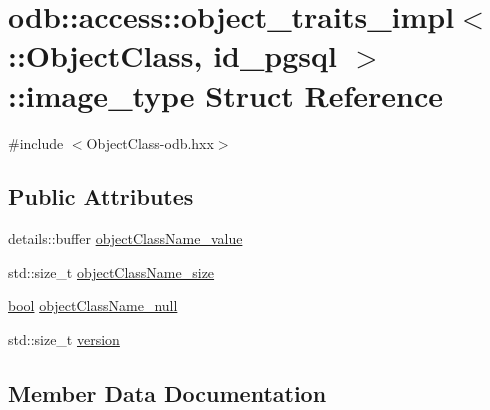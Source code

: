 \hypertarget{structodb_1_1access_1_1object__traits__impl_3_01_1_1_object_class_00_01id__pgsql_01_4_1_1image__type}{}\section{odb\+:\+:access\+:\+:object\+\_\+traits\+\_\+impl$<$ \+:\+:Object\+Class, id\+\_\+pgsql $>$\+:\+:image\+\_\+type Struct Reference}
\label{structodb_1_1access_1_1object__traits__impl_3_01_1_1_object_class_00_01id__pgsql_01_4_1_1image__type}


{\ttfamily \#include $<$Object\+Class-\/odb.\+hxx$>$}

\subsection*{Public Attributes}
\begin{DoxyCompactItemize}
\item 
details\+::buffer \hyperlink{structodb_1_1access_1_1object__traits__impl_3_01_1_1_object_class_00_01id__pgsql_01_4_1_1image__type_a1c1f1c19eaa6bdc564aa4c30da26626b}{object\+Class\+Name\+\_\+value}
\item 
std\+::size\+\_\+t \hyperlink{structodb_1_1access_1_1object__traits__impl_3_01_1_1_object_class_00_01id__pgsql_01_4_1_1image__type_a858e41c1579c8843d3b17fa51b69c359}{object\+Class\+Name\+\_\+size}
\item 
\hyperlink{classodb_1_1access_1_1object__traits_3_01_1_1_object_class_01_4_a1f9680cb812834a08dfbf195bd41a057}{bool} \hyperlink{structodb_1_1access_1_1object__traits__impl_3_01_1_1_object_class_00_01id__pgsql_01_4_1_1image__type_a8605f8b57d3cb0097cca70504c8a896c}{object\+Class\+Name\+\_\+null}
\item 
std\+::size\+\_\+t \hyperlink{structodb_1_1access_1_1object__traits__impl_3_01_1_1_object_class_00_01id__pgsql_01_4_1_1image__type_a17183f0fd7192c39daf4dabe142b771b}{version}
\end{DoxyCompactItemize}


\subsection{Member Data Documentation}
\hypertarget{structodb_1_1access_1_1object__traits__impl_3_01_1_1_object_class_00_01id__pgsql_01_4_1_1image__type_a8605f8b57d3cb0097cca70504c8a896c}{}
